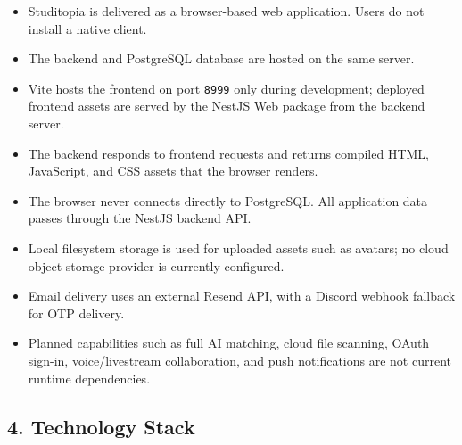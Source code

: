 \documentclass[12pt]{article}
\begin{document}
\begin{itemize}
\item Studitopia is delivered as a browser-based web application. Users do not install a native client.
\item The backend and PostgreSQL database are hosted on the same server.
\item Vite hosts the frontend on port \texttt{8999} only during development; deployed frontend assets are served by the NestJS Web package from the backend server.
\item The backend responds to frontend requests and returns compiled HTML, JavaScript, and CSS assets that the browser renders.
\item The browser never connects directly to PostgreSQL. All application data passes through the NestJS backend API.
\item Local filesystem storage is used for uploaded assets such as avatars; no cloud object-storage provider is currently configured.
\item Email delivery uses an external Resend API, with a Discord webhook fallback for OTP delivery.
\item Planned capabilities such as full AI matching, cloud file scanning, OAuth sign-in, voice/livestream collaboration, and push notifications are not current runtime dependencies.
\end{itemize}
\par\medskip

\hypertarget{sec:4-technology-stack}{}
\subsection*{4. Technology Stack}
\par\medskip
\end{document}
